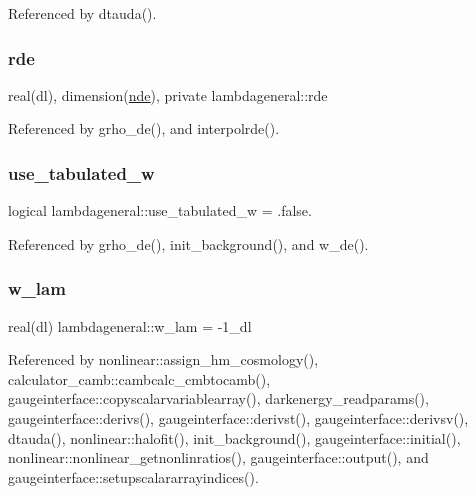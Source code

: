 Referenced by dtauda().

\mbox{\label{namespacelambdageneral_addbcd4776d6d01e9839013990b02fd91}} 
\subsubsection{\texorpdfstring{rde}{rde}}
{\footnotesize\ttfamily real(dl), dimension(\mbox{\hyperlink{namespacelambdageneral_ae21da0c8fff86159b789dee9579bd7d5}{nde}}), private lambdageneral\+::rde\hspace{0.3cm}{\ttfamily [private]}}



Referenced by grho\+\_\+de(), and interpolrde().

\mbox{\label{namespacelambdageneral_af7e90af593ee4c5594024dff73234360}} 
\subsubsection{\texorpdfstring{use\+\_\+tabulated\+\_\+w}{use\_tabulated\_w}}
{\footnotesize\ttfamily logical lambdageneral\+::use\+\_\+tabulated\+\_\+w = .false.}



Referenced by grho\+\_\+de(), init\+\_\+background(), and w\+\_\+de().

\mbox{\label{namespacelambdageneral_aa974593ba987c77d2bf09655570fab6a}} 
\subsubsection{\texorpdfstring{w\+\_\+lam}{w\_lam}}
{\footnotesize\ttfamily real(dl) lambdageneral\+::w\+\_\+lam = -\/1\+\_\+dl}



Referenced by nonlinear\+::assign\+\_\+hm\+\_\+cosmology(), calculator\+\_\+camb\+::cambcalc\+\_\+cmbtocamb(), gaugeinterface\+::copyscalarvariablearray(), darkenergy\+\_\+readparams(), gaugeinterface\+::derivs(), gaugeinterface\+::derivst(), gaugeinterface\+::derivsv(), dtauda(), nonlinear\+::halofit(), init\+\_\+background(), gaugeinterface\+::initial(), nonlinear\+::nonlinear\+\_\+getnonlinratios(), gaugeinterface\+::output(), and gaugeinterface\+::setupscalararrayindices().

